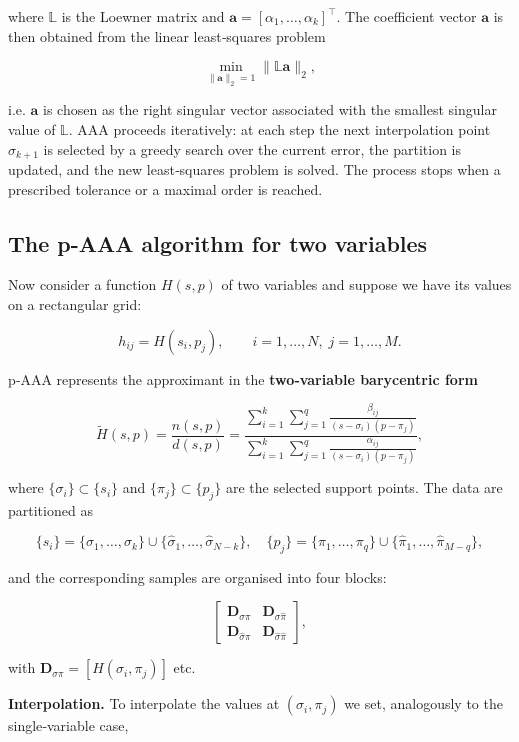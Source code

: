 \documentclass{article}
\begin{document}
where \(\mathbb{L}\) is the Loewner matrix and \(\mathbf{a}=[\alpha_1,\dots,\alpha_k]^{\top}\).  
The coefficient vector \(\mathbf{a}\) is then obtained from the linear least‑squares problem  

\[
\min_{\|\mathbf{a}\|_2=1}\|\mathbb{L}\mathbf{a}\|_2,
\tag{2.10}
\]

i.e. \(\mathbf{a}\) is chosen as the right singular vector associated with the smallest singular value of \(\mathbb{L}\).  
AAA proceeds iteratively: at each step the next interpolation point \(\sigma_{k+1}\) is selected by a greedy search over the current error, the partition is updated, and the new least‑squares problem is solved. The process stops when a prescribed tolerance or a maximal order is reached.

\subsection{The p-AAA algorithm for two variables}

Now consider a function \(H(s,p)\) of two variables and suppose we have its values on a rectangular grid:

\[
h_{ij}=H(s_i,p_j),\qquad i=1,\dots,N,\;j=1,\dots,M.
\tag{3.1}
\]

p‑AAA represents the approximant in the \textbf{two‑variable barycentric form}

\[
\tilde{H}(s,p)=\frac{n(s,p)}{d(s,p)}
=\frac{\sum_{i=1}^{k}\sum_{j=1}^{q}\frac{\beta_{ij}}{(s-\sigma_i)(p-\pi_j)}}
{\sum_{i=1}^{k}\sum_{j=1}^{q}\frac{\alpha_{ij}}{(s-\sigma_i)(p-\pi_j)}},
\tag{3.2}
\]

where \(\{\sigma_i\}\subset\{s_i\}\) and \(\{\pi_j\}\subset\{p_j\}\) are the selected support points.  
The data are partitioned as

\[
\{s_i\}=\{\sigma_1,\dots,\sigma_k\}\cup\{\hat\sigma_1,\dots,\hat\sigma_{N-k}\},\quad
\{p_j\}=\{\pi_1,\dots,\pi_q\}\cup\{\hat\pi_1,\dots,\hat\pi_{M-q}\},
\tag{3.3}
\]

and the corresponding samples are organised into four blocks:

\[
\left[\begin{array}{c|c}
\mathbf{D}_{\sigma\pi} & \mathbf{D}_{\sigma\hat\pi}\\\hline
\mathbf{D}_{\hat\sigma\pi} & \mathbf{D}_{\hat\sigma\hat\pi}
\end{array}\right],
\]

with \(\mathbf{D}_{\sigma\pi}=[H(\sigma_i,\pi_j)]\) etc.

\textbf{Interpolation.} To interpolate the values at \((\sigma_i,\pi_j)\) we set, analogously to the single‑variable case,
\end{document}
